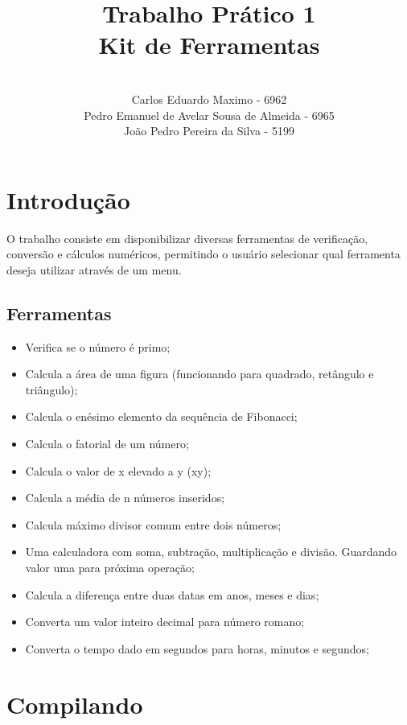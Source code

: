 \documentclass[12pt]{article}
\title{Trabalho Prático 1\\
Kit de Ferramentas}
\author{\\Carlos Eduardo Maximo - 6962 \inst{1}\\
Pedro Emanuel de Avelar Sousa de Almeida - 6965\inst{2}\\
João Pedro Pereira da Silva - 5199\inst{3}}
\begin{document}
 

\maketitle

\section{Introdução}
O trabalho consiste em disponibilizar diversas ferramentas de verificação, conversão e cálculos numéricos, permitindo o usuário selecionar qual ferramenta deseja utilizar através de um menu.

\subsection{Ferramentas} \label{sec:arquitetura}
\begin{itemize}
\item Verifica se o número é primo;
\item Calcula a área de uma figura (funcionando para quadrado, retângulo e triângulo);
\item Calcula o enésimo elemento da sequência de Fibonacci;
\item Calcula o fatorial de um número;
\item Calcula o valor de x elevado a y (xy);
\item Calcula a média de n números inseridos;
\item Calcula máximo divisor comum entre dois números;
\item Uma calculadora com soma, subtração, multiplicação e divisão. Guardando valor uma para próxima operação;
\item Calcula a diferença entre duas datas em anos, meses e dias;
\item Converta um valor inteiro decimal para número romano;
\item Converta o tempo dado em segundos para horas, minutos e segundos;

\end{itemize}
\newpage

\section{Compilando}
\end{document}
